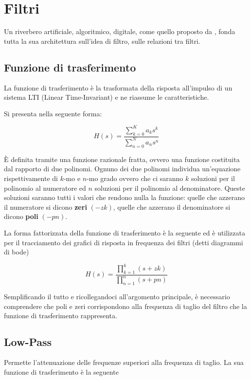 \section{Filtri}

Un riverbero artificiale, algoritmico, digitale, come quello proposto da \ms,
fonda tutta la sua architettura sull'idea di filtro, sulle relazioni tra filtri.

\subsection{Funzione di trasferimento}

La funzione di trasferimento è la trasformata della risposta all’impulso di un
sistema LTI (Linear Time-Invariant) e ne riassume le caratteristiche.

Si presenta nella seguente forma:

\begin{equation}
H(s)=\frac{\sum_{k=0}^K a_k s^k}{\sum_{n=0}^N a_n s^n}
\end{equation}

È definita tramite una funzione razionale fratta, ovvero una funzione costituita
dal rapporto di due polinomi. Ognuno dei due polinomi individua un’equazione
rispettivamente di $k$-mo e $n$-mo grado ovvero che ci saranno $k$ soluzioni
per il polinomio al numeratore ed $n$ soluzioni per il polinomio al denominatore.
Queste soluzioni saranno tutti i valori che rendono nulla la funzione:
quelle che azzerano il numeratore si dicono \textbf{zeri} $(-zk)$, quelle che
azzerano il denominatore si dicono \textbf{poli} $(-pn)$.

La forma fattorizzata della funzione di trasferimento è la seguente ed è
utilizzata per il tracciamento dei grafici di risposta in frequenza dei filtri
(detti diagrammi di bode)

\begin{equation}
H(s)=\frac{\prod_{k=1}^k (s+zk)}{\prod_{n=1}^n (s+pn)}
\end{equation}

Semplificando il tutto e ricollegandoci all’argomento principale, è necessario
comprendere che poli e zeri corrispondono alla frequenza di taglio del filtro
che la funzione di trasferimento rappresenta.

\subsection{Low-Pass}

Permette l’attenuazione delle frequenze superiori alla frequenza di taglio.
La sua funzione di trasferimento è la seguente

